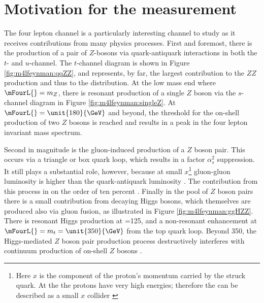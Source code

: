 
\section{Motivation for the \mFourL{} measurement}
\label{sec:fourlepmotivation}

The four lepton channel is a particularly interesting channel to study as it receives contributions from many physics processes. First and foremost, there is the production of a pair of $Z$-bosons via quark-antiquark interactions in  both the $t$- and $u$-channel. The $t$-channel diagram is shown in Figure \ref{fig:m4lfeynman:qqZZ}, and represents, by far,  the largest contribution to the $ZZ$ production and thus to the \mFourL{} distribution. At the low mass end where $\mFourL{}=m_{Z}$, there is resonant production of a single $Z$ boson via the $s$-channel diagram in Figure \ref{fig:m4lfeynman:singleZ}. At $\mFourL{}=\unit{180}{\GeV}$ and beyond, the threshold for the on-shell production of two $Z$ bosons is reached and results in a peak in the four lepton invariant mass spectrum. 

Second in magnitude is the gluon-induced production of a $Z$ boson pair. This occurs via a triangle or box quark loop, which results in a factor $\alpha_s^2$ suppression. It still plays a substantial role, however, because at small $x$\footnote{Here $x$ is the component of the proton's momentum carried by the struck quark. At the \LHC the protons have very high energies; therefore the \LHC can be described as a small $x$ collider \cite{zotov2012small}} gluon-gluon luminosity is higher than the quark-antiquark luminosity \cite{Glover:194539}. The contribution from this process in on the order of ten percent \cite{Becker:2230817}. Finally in the pool of $Z$ boson pairs there is a small contribution from decaying Higgs bosons, which themselves are produced also via gluon fusion, as illustrated in Figure \ref{fig:m4lfeynman:ggHZZ}. There is resonant Higgs production at \mFourL=\unit{125}{\GeV}, and a non-resonant enhancement at $\mFourL{}=m_{t}=\unit{350}{\GeV}$ from the top quark loop. Beyond \unit{350}{\GeV}, the Higgs-mediated $Z$ boson pair production process destructively interferes with continuum production of on-shell $Z$ bosons \cite{Campbell_2016}.

